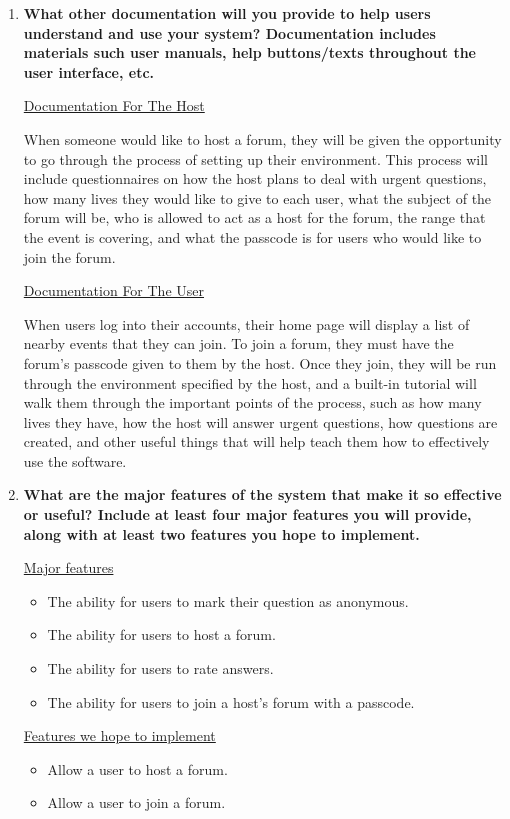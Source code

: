 \documentclass[12pt]{article}
\begin{document}
\begin{enumerate}
    \item \textbf{What other documentation will you provide to help users understand and use your system? Documentation includes materials such user manuals, help buttons/texts throughout the user interface, etc.}

\underline{Documentation For The Host}

When someone would like to host a forum, they will be given the opportunity to go through the process of setting up their environment. This process will include questionnaires on how the host plans to deal with urgent questions, how many lives they would like to give to each user, what the subject of the forum will be, who is allowed to act as a host for the forum, the range that the event is covering, and what the passcode is for users who would like to join the forum. 

\underline{Documentation For The User}

When users log into their accounts, their home page will display a list of nearby events that they can join. To join a forum, they must have the forum's passcode given to them by the host. Once they join, they will be run through the environment specified by the host, and a built-in tutorial will walk them through the important points of the process, such as how many lives they have, how the host will answer urgent questions, how questions are created, and other useful things that will help teach them how to effectively use the software.

    \item \textbf{What are the major features of the system that make it so effective or useful? Include at least four major features you will provide, along with at least two features you hope to implement.}

\underline{Major features}
\begin{itemize}
\item The ability for users to mark their question as anonymous.
\item The ability for users to host a forum.
\item The ability for users to rate answers.
\item The ability for users to join a host's forum with a passcode. 
\end{itemize}

\underline{Features we hope to implement}
\begin{itemize}
\item Allow a user to host a forum.
\item Allow a user to join a forum.
\end{itemize}
\end{enumerate}
\end{document}
